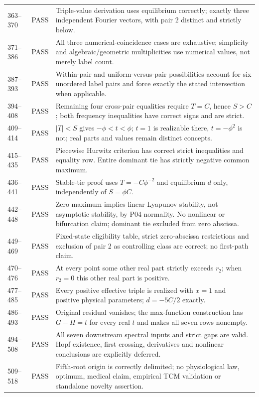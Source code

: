 \documentclass[11pt]{article}
\begin{document}
\begin{longtable}{@{}L{0.11\textwidth}L{0.10\textwidth}L{0.73\textwidth}@{}}
363--370&PASS&Triple-value derivation uses equilibrium correctly; exactly three independent Fourier vectors, with pair 2 distinct and strictly below.\\
371--386&PASS&All three numerical-coincidence cases are exhaustive; simplicity and algebraic/geometric multiplicities use numerical values, not merely label count.\\
387--393&PASS&Within-pair and uniform-versus-pair possibilities account for six unordered label pairs and force exactly the stated intersection when applicable.\\
394--408&PASS&Remaining four cross-pair equalities require $T=C$, hence $S>C$; both frequency inequalities have correct signs and are strict.\\
409--414&PASS&$|T|<S$ gives $-\phi<t<\phi$; $t=1$ is realizable there, $t=-\phi^2$ is not; real parts and values remain distinct concepts.\\
415--435&PASS&Piecewise Hurwitz criterion has correct strict inequalities and equality row. Entire dominant tie has strictly negative common maximum.\\
436--441&PASS&Stable-tie proof uses $T=-C\phi^{-2}$ and equilibrium $d$ only, independently of $S=\phi C$.\\
442--448&PASS&Zero maximum implies linear Lyapunov stability, not asymptotic stability, by P04 normality. No nonlinear or bifurcation claim; dominant tie excluded from zero abscissa.\\
449--469&PASS&Fixed-state eligibility table, strict zero-abscissa restrictions and exclusion of pair 2 as controlling class are correct; no first-path claim.\\
470--476&PASS&At every point some other real part strictly exceeds $r_2$; when $r_2=0$ this other real part is positive.\\
477--485&PASS&Every positive effective triple is realized with $x=1$ and positive physical parameters; $d=-5C/2$ exactly.\\
486--493&PASS&Original residual vanishes; the max-function construction has $G-H=t$ for every real $t$ and makes all seven rows nonempty.\\
494--508&PASS&All seven downstream spectral inputs and strict gaps are valid. Hopf existence, first crossing, derivatives and nonlinear conclusions are explicitly deferred.\\
509--518&PASS&Fifth-root origin is correctly delimited; no physiological law, optimum, medical claim, empirical TCM validation or standalone novelty assertion.\\

\end{longtable}
\end{document}
